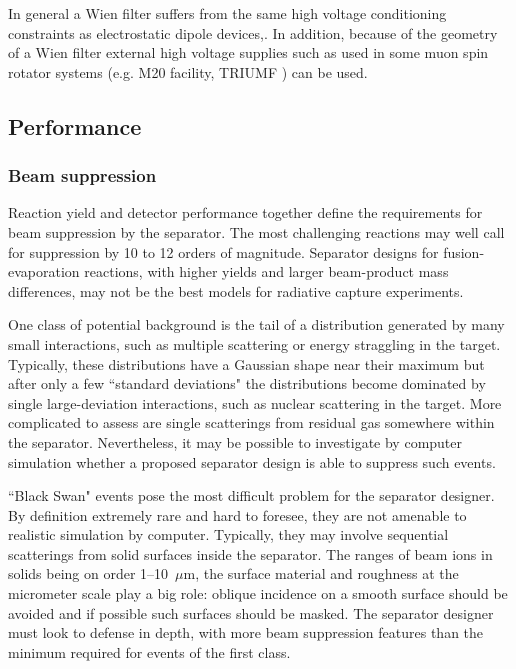 In general a Wien filter suffers from the same high voltage conditioning constraints as electrostatic dipole devices,. In addition, because of the geometry of a Wien filter external high voltage supplies such as used in some muon spin rotator systems (e.g. M20 facility, TRIUMF \cite{bev85}) can be used. 

\subsection{Performance}

\subsubsection{Beam suppression}
Reaction yield and detector performance together define the requirements for beam suppression by the separator.    The most challenging reactions  may well call for suppression by 10 to 12 orders of magnitude.    Separator designs for fusion-evaporation reactions, with higher yields and larger beam-product mass differences, may not be the best models  for radiative capture experiments.   
    
 One class of potential background is the tail of a  distribution generated by many small interactions, such as multiple scattering or energy straggling in the target.    Typically, these distributions have a Gaussian shape near their maximum but after only a few  ``standard deviations" the distributions become dominated by single large-deviation interactions, such as nuclear scattering in the target.    More complicated to assess are single scatterings from residual gas somewhere within the separator.   Nevertheless, it may be possible to investigate by computer simulation whether  a proposed separator design is able to suppress such events.
 
  ``Black Swan" events pose the most difficult problem for the separator designer.   By definition extremely rare and hard to foresee,  they are not  amenable to realistic simulation by computer.   Typically, they may involve sequential scatterings from  solid surfaces inside the separator.   The ranges of beam ions in solids being on order 1--10~$\mu$m, the surface material and roughness at the micrometer scale play a big role: oblique incidence on a smooth surface should be avoided and if possible such surfaces should be masked.   The separator designer must look to defense in depth, with more beam suppression features than the minimum required for events of the first  class.

